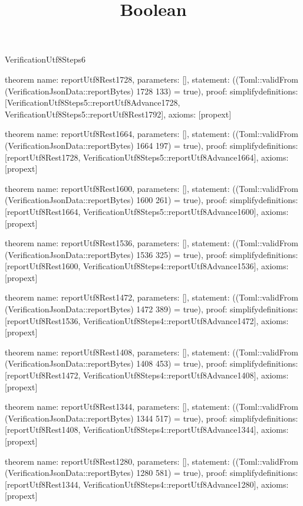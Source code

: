 \begin{lexlean}{VerificationUtf8Steps6}
\title{Boolean}
\begin{semanticmodule}

theorem{
  name: reportUtf8Rest1728,
  parameters: [],
  statement: ((Toml::validFrom (VerificationJsonData::reportBytes) 1728 133) = true),
  proof: simplify{definitions: [VerificationUtf8Steps5::reportUtf8Advance1728, VerificationUtf8Steps5::reportUtf8Rest1792]},
  axioms: [propext]
}

theorem{
  name: reportUtf8Rest1664,
  parameters: [],
  statement: ((Toml::validFrom (VerificationJsonData::reportBytes) 1664 197) = true),
  proof: simplify{definitions: [reportUtf8Rest1728, VerificationUtf8Steps5::reportUtf8Advance1664]},
  axioms: [propext]
}

theorem{
  name: reportUtf8Rest1600,
  parameters: [],
  statement: ((Toml::validFrom (VerificationJsonData::reportBytes) 1600 261) = true),
  proof: simplify{definitions: [reportUtf8Rest1664, VerificationUtf8Steps5::reportUtf8Advance1600]},
  axioms: [propext]
}

theorem{
  name: reportUtf8Rest1536,
  parameters: [],
  statement: ((Toml::validFrom (VerificationJsonData::reportBytes) 1536 325) = true),
  proof: simplify{definitions: [reportUtf8Rest1600, VerificationUtf8Steps4::reportUtf8Advance1536]},
  axioms: [propext]
}

theorem{
  name: reportUtf8Rest1472,
  parameters: [],
  statement: ((Toml::validFrom (VerificationJsonData::reportBytes) 1472 389) = true),
  proof: simplify{definitions: [reportUtf8Rest1536, VerificationUtf8Steps4::reportUtf8Advance1472]},
  axioms: [propext]
}

theorem{
  name: reportUtf8Rest1408,
  parameters: [],
  statement: ((Toml::validFrom (VerificationJsonData::reportBytes) 1408 453) = true),
  proof: simplify{definitions: [reportUtf8Rest1472, VerificationUtf8Steps4::reportUtf8Advance1408]},
  axioms: [propext]
}

theorem{
  name: reportUtf8Rest1344,
  parameters: [],
  statement: ((Toml::validFrom (VerificationJsonData::reportBytes) 1344 517) = true),
  proof: simplify{definitions: [reportUtf8Rest1408, VerificationUtf8Steps4::reportUtf8Advance1344]},
  axioms: [propext]
}

theorem{
  name: reportUtf8Rest1280,
  parameters: [],
  statement: ((Toml::validFrom (VerificationJsonData::reportBytes) 1280 581) = true),
  proof: simplify{definitions: [reportUtf8Rest1344, VerificationUtf8Steps4::reportUtf8Advance1280]},
  axioms: [propext]
}

\end{semanticmodule}
\end{lexlean}
